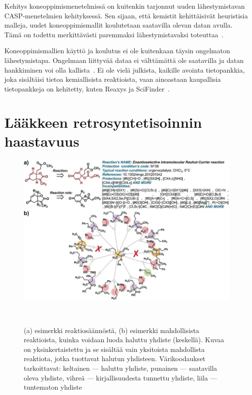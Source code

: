 \documentclass[finnish,twoside,censored,tkt,sw-line]{HYthesisML}
\begin{document}
Kehitys koneoppimismenetelmissä on kuitenkin tarjonnut uuden lähestymistavan CASP-menetelmien kehityksessä.
Sen sijaan, että kemistit kehittäisivät heuristisia malleja, uudet koneoppimismallit koulutetaan saatavilla olevan datan avulla.
Tämä on todettu merkittävästi paremmaksi lähestymistavaksi toteuttaa~\cite{ColeyConnorW2018MLiC}.

Koneoppimismallien käyttö ja koulutus ei ole kuitenkaan täysin ongelmaton lähestymistapa.
Ongelmaan liittyvää dataa ei välttämättä ole saatavilla ja datan hankkiminen voi olla kallista~\cite{deAlmeidaA.Filipa2019Socd}.
Ei ole vielä julkista, kaikille avointa tietopankkia, joka sisältäisi tietoa kemiallisista reaktioista, vaan ainoastaan kaupallisia tietopankkeja on kehitetty, kuten Reaxys ja SciFinder~\cite{deAlmeidaA.Filipa2019Socd}.

\section{Lääkkeen retrosyntetisoinnin haastavuus}

\begin{figure}[!ht]
    \centering
    \includegraphics[width=\textwidth]{retrosynthesis.jpg}
    \caption{(a) esimerkki reaktiosäännöstä, (b) esimerkki mahdollisista reaktioista, kuinka voidaan luoda haluttu yhdiste (keskellä).
        Kuvaa on yksinkertaistettu ja se sisältää vain yksitoista mahdollista reaktiota, jotka tuottavat halutun yhdisteen.
        Värikoodaukset tarkoittavat: keltainen --- haluttu yhdiste, punainen --- saatavilla oleva yhdiste, vihreä --- kirjallisuudesta tunnettu yhdiste, liila --- tuntematon yhdiste}
    {~\cite{ExpertKnowledgeRetorsynthesis}}
    \label{fig:retrosynthesis-example}
\end{figure}
\end{document}
